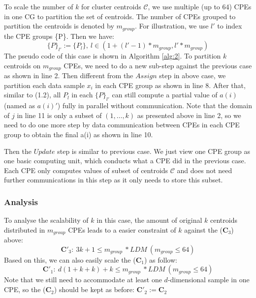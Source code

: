 To scale the number of $k$ for cluster centroids $\mathcal{C}$, we use multiple (up to 64) CPEs in one CG to partition the set of centroids. The number of CPEs grouped to partition the centroids is denoted by $m_{group}$. For illustration, we use $l'$ to index the CPE groups \{P\}. Then we have:
$$ \{P\}_{l'} := \{P_l\},\ l \in (1+(l'-1)*m_{group}, l'*m_{group}) $$
The pseudo code of this case is shown in Algorithm \ref{alg:2}. To partition $k$ centroids on $m_{group}$ CPEs, we need to do a new sub-step against the previous case as shown in line 2.
Then different from the $Assign$ step in above case, we partition each data sample $x_i$ in each CPE group as shown in line 8.
After that, similar to (1.2), all $P_l$ in each $\{P\}_{l'}$ can still compute a partial value of $a(i)$ (named as $a(i)'$) fully in parallel without communication.   
Note that the domain of $j$ in line 11 is only a subset of $(1,\ldots,k)$ as presented above in line 2, so we need to do one more step by data communication between CPEs in each CPE group to obtain the final a(i) as shown in line 10.

Then the $Update$ step is similar to previous case. We just view one CPE group as one basic computing unit, which conducts what a CPE did in the previous case. Each CPE only computes values of subset of centroids $\mathcal{C}$ and does not need further communications in this step as it only needs to store this subset.  

\subsubsection*{Analysis} 
To analyse the scalability of $k$ in this case, the amount of original $k$ centroids distributed in $m_{group}$ CPEs leads to a easier constraint of $k$ against the ($\mathbf{C}_3$) above: 
$$\mathbf{C'}_3:\ 3k+1 \leq m_{group}\ *LDM \ (m_{group} \leq 64) $$
Based on this, we can also easily scale the ($\mathbf{C}_1$) as follow: 
$$\mathbf{C'}_1:\ d(1+k+k)+k \leq m_{group}\ *LDM   \ (m_{group} \leq 64)$$
Note that we still need to accommodate at least one $d$-dimensional sample in one CPE, so the ($\mathbf{C}_2$) should be kept as before:
$ \mathbf{C'}_2:= \mathbf{C}_2$

